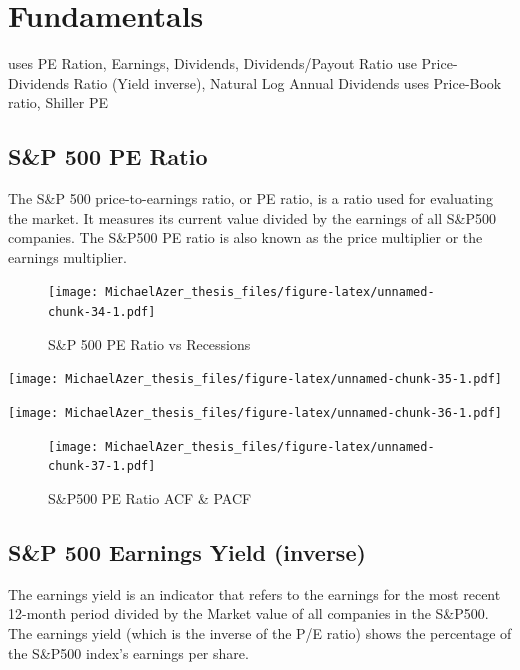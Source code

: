 \documentclass[]{book}
\begin{document}
\hypertarget{fundamentals}{%
\section{Fundamentals}\label{fundamentals}}

\citep{carlson1997recent} uses PE Ration, Earnings, Dividends, Dividends/Payout Ratio
\citep{brennan1998stripping} use Price-Dividends Ratio (Yield inverse), Natural Log Annual Dividends
\citep{keimling2016predicting} uses Price-Book ratio, Shiller PE

\hypertarget{sp-500-pe-ratio}{%
\subsection{S\&P 500 PE Ratio}\label{sp-500-pe-ratio}}

The S\&P 500 price-to-earnings ratio, or PE ratio, is a ratio used for evaluating the market. It measures its current value divided by the earnings of all S\&P500 companies. The S\&P500 PE ratio is also known as the price multiplier or the earnings multiplier.

\begin{figure}
\centering
\texttt{[image: MichaelAzer\_thesis\_files/figure-latex/unnamed-chunk-34-1.pdf]}
\caption{\label{fig:unnamed-chunk-34}\label{fig:figs}S\&P 500 PE Ratio vs Recessions}
\end{figure}

\texttt{[image: MichaelAzer\_thesis\_files/figure-latex/unnamed-chunk-35-1.pdf]}

\texttt{[image: MichaelAzer\_thesis\_files/figure-latex/unnamed-chunk-36-1.pdf]}

\begin{figure}
\centering
\texttt{[image: MichaelAzer\_thesis\_files/figure-latex/unnamed-chunk-37-1.pdf]}
\caption{\label{fig:unnamed-chunk-37}\label{fig:figs}S\&P500 PE Ratio ACF \& PACF}
\end{figure}

\hypertarget{sp-500-earnings-yield-inverse}{%
\subsection{S\&P 500 Earnings Yield (inverse)}\label{sp-500-earnings-yield-inverse}}

The earnings yield is an indicator that refers to the earnings for the most recent 12-month period divided by the Market value of all companies in the S\&P500. The earnings yield (which is the inverse of the P/E ratio) shows the percentage of the S\&P500 index's earnings per share.
\end{document}
